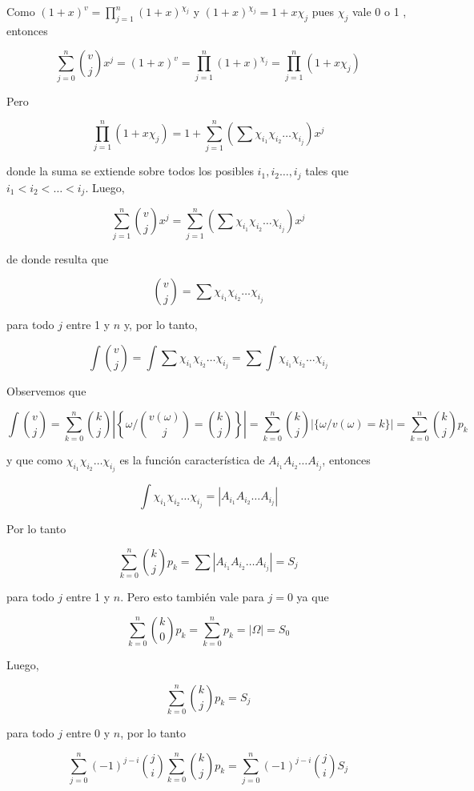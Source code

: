 \documentclass[10pt]{article}
\begin{document}
Como $(1+x)^{v}=\prod_{j=1}^{n}(1+x)^{\chi_{j}}$ y $(1+x)^{\chi_{j}}=1+x \chi_{j}$ pues $\chi_{j}$ vale 0 o 1 , entonces

$$
\sum_{j=0}^{n}\binom{v}{j} x^{j}=(1+x)^{v}=\prod_{j=1}^{n}(1+x)^{\chi_{j}}=\prod_{j=1}^{n}\left(1+x \chi_{j}\right)
$$

Pero

$$
\prod_{j=1}^{n}\left(1+x \chi_{j}\right)=1+\sum_{j=1}^{n}\left(\sum \chi_{i_{1}} \chi_{i_{2}} \ldots \chi_{i_{j}}\right) x^{j}
$$

donde la suma se extiende sobre todos los posibles $i_{1}, i_{2} \ldots, i_{j}$ tales que $i_{1}<i_{2}<\ldots<i_{j}$. Luego,

$$
\sum_{j=1}^{n}\binom{v}{j} x^{j}=\sum_{j=1}^{n}\left(\sum \chi_{i_{1}} \chi_{i_{2}} \ldots \chi_{i_{j}}\right) x^{j}
$$

de donde resulta que

$$
\binom{v}{j}=\sum \chi_{i_{1}} \chi_{i_{2}} \ldots \chi_{i_{j}}
$$

para todo $j$ entre 1 y $n$ y, por lo tanto,

$$
\int\binom{v}{j}=\int \sum \chi_{i_{1}} \chi_{i_{2}} \ldots \chi_{i_{j}}=\sum \int \chi_{i_{1}} \chi_{i_{2}} \ldots \chi_{i_{j}}
$$

Observemos que

$$
\int\binom{v}{j}=\sum_{k=0}^{n}\binom{k}{j}\left|\left\{\omega /\binom{v(\omega)}{j}=\binom{k}{j}\right\}\right|=\sum_{k=0}^{n}\binom{k}{j}|\{\omega / v(\omega)=k\}|=\sum_{k=0}^{n}\binom{k}{j} p_{k}
$$

y que como $\chi_{i_{1}} \chi_{i_{2}} \ldots \chi_{i_{j}}$ es la función característica de $A_{i_{1}} A_{i_{2}} \ldots A_{i_{j}}$, entonces

$$
\int \chi_{i_{1}} \chi_{i_{2}} \ldots \chi_{i_{j}}=\left|A_{i_{1}} A_{i_{2}} \ldots A_{i_{j}}\right|
$$

Por lo tanto

$$
\sum_{k=0}^{n}\binom{k}{j} p_{k}=\sum\left|A_{i_{1}} A_{i_{2}} \ldots A_{i_{j}}\right|=S_{j}
$$

para todo $j$ entre 1 y $n$. Pero esto también vale para $j=0$ ya que

$$
\sum_{k=0}^{n}\binom{k}{0} p_{k}=\sum_{k=0}^{n} p_{k}=|\Omega|=S_{0}
$$

Luego,

$$
\sum_{k=0}^{n}\binom{k}{j} p_{k}=S_{j}
$$

para todo $j$ entre 0 y $n$, por lo tanto

$$
\sum_{j=0}^{n}(-1)^{j-i}\binom{j}{i} \sum_{k=0}^{n}\binom{k}{j} p_{k}=\sum_{j=0}^{n}(-1)^{j-i}\binom{j}{i} S_{j}
$$
\end{document}
